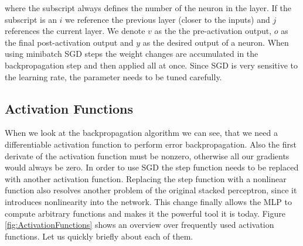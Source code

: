 where the subscript always defines the number of the neuron in the layer. If the subscript is an $i$ we reference the previous layer (closer to the inputs) and $j$ references the current layer. We denote $v$ as the the pre-activation output, $o$ as the final post-activation output and $y$ as the desired output of a neuron.
When using minibatch SGD steps the weight changes are accumulated in the backpropagation step and then applied all at once. Since SGD is very sensitive to the learning rate, the parameter needs to be tuned carefully.

\subsection{Activation Functions} \label{ssec:ActivationFunctions}
When we look at the backpropagation algorithm we can see, that we need a differentiable activation function to perform error backpropagation. Also the first derivate of the activation function must be nonzero, otherwise all our gradients would always be zero. In order to use SGD the step function needs to be replaced with another activation function. Replacing the step function with a nonlinear function also resolves another problem of the original stacked perceptron, since it introduces nonlinearity into the network. This change finally allows the MLP to compute arbitrary functions and makes it the powerful tool it is today. Figure \ref{fig:ActivationFunctions} shows an overview over frequently used activation functions. Let us quickly briefly about each of them.


